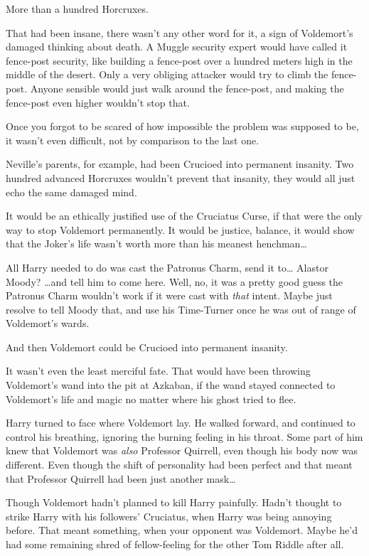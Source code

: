 More than a hundred Horcruxes.

That had been insane, there wasn't any other word for it, a sign of Voldemort's damaged thinking about death. A Muggle security expert would have called it fence-post security, like building a fence-post over a hundred meters high in the middle of the desert. Only a very obliging attacker would try to climb the fence-post. Anyone sensible would just walk around the fence-post, and making the fence-post even higher wouldn't stop that.

Once you forgot to be scared of how impossible the problem was supposed to be, it wasn't even difficult, not by comparison to the last one.

Neville's parents, for example, had been Crucioed into permanent insanity. Two hundred advanced Horcruxes wouldn't prevent that insanity, they would all just echo the same damaged mind.

It would be an ethically justified use of the Cruciatus Curse, if that were the only way to stop Voldemort permanently. It would be justice, balance, it would show that the Joker's life wasn't worth more than his meanest henchman{\ldots}

All Harry needed to do was cast the Patronus Charm, send it to{\ldots} Alastor Moody? {\ldots}and tell him to come here. Well, no, it was a pretty good guess the Patronus Charm wouldn't work if it were cast with \emph{that} intent. Maybe just resolve to tell Moody that, and use his Time-Turner once he was out of range of Voldemort's wards.

And then Voldemort could be Crucioed into permanent insanity.

It wasn't even the least merciful fate. That would have been throwing Voldemort's wand into the pit at Azkaban, if the wand stayed connected to Voldemort's life and magic no matter where his ghost tried to flee.

Harry turned to face where Voldemort lay. He walked forward, and continued to control his breathing, ignoring the burning feeling in his throat. Some part of him knew that Voldemort was \emph{also} Professor Quirrell, even though his body now was different. Even though the shift of personality had been perfect and that meant that Professor Quirrell had been just another mask{\ldots}

Though Voldemort hadn't planned to kill Harry painfully. Hadn't thought to strike Harry with his followers' Cruciatus, when Harry was being annoying before. That meant something, when your opponent was Voldemort. Maybe he'd had some remaining shred of fellow-feeling for the other Tom Riddle after all.

